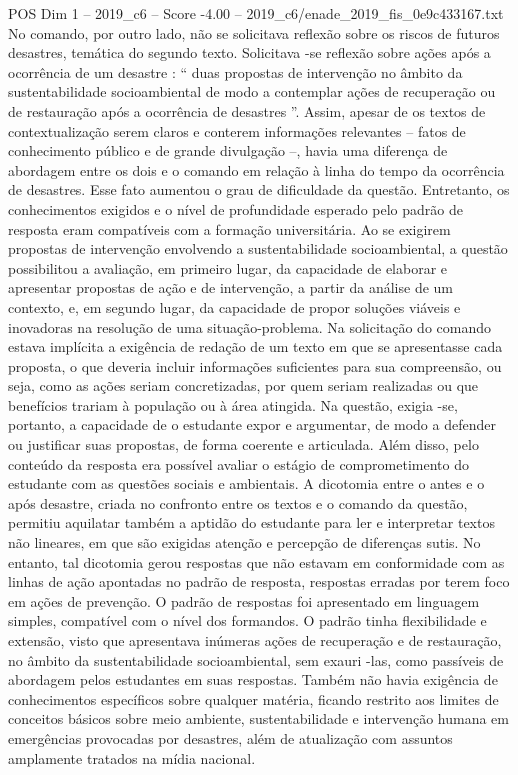 \begin{textsample}{POS Dim 1 – 2019\_c6 – Score -4.00 – 2019\_c6/enade\_2019\_fis\_0e9c433167.txt}
No comando, por outro lado, não se solicitava reflexão sobre os riscos de futuros desastres, temática do segundo texto.
Solicitava -se reflexão sobre ações após a ocorrência de um desastre : “ duas propostas de intervenção no âmbito da sustentabilidade socioambiental de modo a contemplar ações de recuperação ou de restauração após a ocorrência de desastres ”.
Assim, apesar de os textos de contextualização serem claros e conterem informações relevantes – fatos de conhecimento público e de grande divulgação –, havia uma diferença de abordagem entre os dois e o comando em relação à linha do tempo da ocorrência de desastres.
Esse fato aumentou o grau de dificuldade da questão.
Entretanto, os conhecimentos exigidos e o nível de profundidade esperado pelo padrão de resposta eram compatíveis com a formação universitária.
Ao se exigirem propostas de intervenção envolvendo a sustentabilidade socioambiental, a questão possibilitou a avaliação, em primeiro lugar, da capacidade de elaborar e apresentar propostas de ação e de intervenção, a partir da análise de um contexto, e, em segundo lugar, da capacidade de propor soluções viáveis e inovadoras na resolução de uma situação-problema.
Na solicitação do comando estava implícita a exigência de redação de um texto em que se apresentasse cada proposta, o que deveria incluir informações suficientes para sua compreensão, ou seja, como as ações seriam concretizadas, por quem seriam realizadas ou que benefícios trariam à população ou à área atingida.
Na questão, exigia -se, portanto, a capacidade de o estudante expor e argumentar, de modo a defender ou justificar suas propostas, de forma coerente e articulada.
Além disso, pelo conteúdo da resposta era possível avaliar o estágio de comprometimento do estudante com as questões sociais e ambientais.
A dicotomia entre o antes e o após desastre, criada no confronto entre os textos e o comando da questão, permitiu aquilatar também a aptidão do estudante para ler e interpretar textos não lineares, em que são exigidas atenção e percepção de diferenças sutis.
No entanto, tal dicotomia gerou respostas que não estavam em conformidade com as linhas de ação apontadas no padrão de resposta, respostas erradas por terem foco em ações de prevenção.
O padrão de respostas foi apresentado em linguagem simples, compatível com o nível dos formandos.
O padrão tinha flexibilidade e extensão, visto que apresentava inúmeras ações de recuperação e de restauração, no âmbito da sustentabilidade socioambiental, sem exauri -las, como passíveis de abordagem pelos estudantes em suas respostas.
Também não havia exigência de conhecimentos específicos sobre qualquer matéria, ficando restrito aos limites de conceitos básicos sobre meio ambiente, sustentabilidade e intervenção humana em emergências provocadas por desastres, além de atualização com assuntos amplamente tratados na mídia nacional.

\end{textsample}
